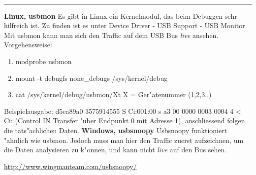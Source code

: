 \documentclass[11pt]{article}
\begin{document}
\begin{minipage}[t]{7cm}
\hfill {\Large{}}\\
\hrule

\medskip


\textbf{Linux, usbmon}
	\newline
	Es gibt in Linux ein Kernelmodul, das beim Debuggen sehr
	hilfreich ist. Zu finden ist es unter Device Driver - USB Support - USB Monitor.
	Mit usbmon kann man sich den Traffic auf dem USB Bus \textit{live} ansehen.
	\newline
	Vorgehensweise:
		\begin{enumerate}
			\item modprobe usbmon 
			\item mount -t debugfs none\_debugs /sys/kernel/debug
			\item  cat /sys/kernel/debug/usbmon/Xt X = Ger"atenummer (1,2,3..)
		\end{enumerate}
	Beispielausgabe:
		d5ea89a0 3575914555 S Ci:001:00 s a3 00 0000 0003 0004 4 <
	\newline
	Ci: (Control IN Transfer "uber Endpunkt 0 mit Adresse 1), 
	anschliessend folgen die tats"achlichen Daten.
	\newline
	\newline
\textbf{Windows, usbsnoopy}
	\newline
	Usbsnoopy funktioniert "ahnlich wie usbmon. Jedoch muss man hier
	den Traffic zuerst aufzeichnen, um die Daten analysieren zu k"onnen, und kann
	nicht \textit{live} auf den Bus sehen.

	\begin{center}
      \url{http://www.wingmanteam.com/usbsnoopy/}
\end{center}



\end{minipage}
\hskip 12mm
\hskip 12mm
\end{document}
